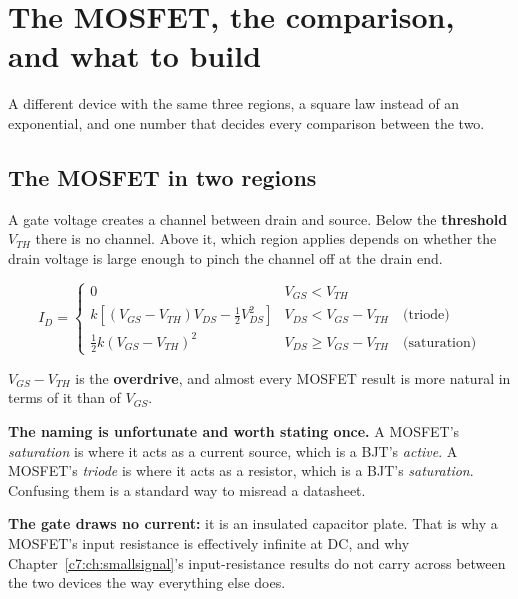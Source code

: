 
\section{The MOSFET, the comparison, and what to build}
\label{c5:app:b}

A different device with the same three regions, a square law instead of an exponential, and one number that decides every comparison between the two.

\subsection{The MOSFET in two regions}
\label{c5:sec:b1}
A gate voltage creates a channel between drain and source. Below the \textbf{threshold} $V_{TH}$ there is no channel. Above it, which region applies depends on whether the drain voltage is large enough to pinch the channel off at the drain end.

\[
  I_D = \begin{cases}
  0 & V_{GS} < V_{TH} \\
  k\left[(V_{GS}-V_{TH})V_{DS} - \tfrac{1}{2}V_{DS}^2\right] & V_{DS} < V_{GS}-V_{TH} \quad \text{(triode)} \\
  \tfrac{1}{2}k(V_{GS}-V_{TH})^2 & V_{DS} \ge V_{GS}-V_{TH} \quad \text{(saturation)}
  \end{cases}
\]

$V_{GS} - V_{TH}$ is the \textbf{overdrive}, and almost every MOSFET result is more natural in terms of it than of $V_{GS}$.


\textbf{The naming is unfortunate and worth stating once.} A MOSFET's \emph{saturation} is where it acts as a current source, which is a BJT's \emph{active}. A MOSFET's \emph{triode} is where it acts as a resistor, which is a BJT's \emph{saturation}. Confusing them is a standard way to misread a datasheet.

\textbf{The gate draws no current:} it is an insulated capacitor plate. That is why a MOSFET's input resistance is effectively infinite at DC, and why Chapter~\ref{c7:ch:smallsignal}'s input-resistance results do not carry across between the two devices the way everything else does.

